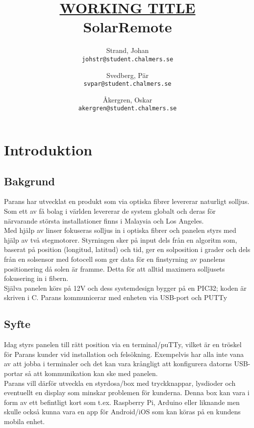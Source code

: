 \documentclass{article}
\author{	Strand, Johan \\ \texttt{johstr@student.chalmers.se} \and
			Svedberg, Pär\\ \texttt{svpar@student.chalmers.se} \and
			Åkergren, Oskar\\ \texttt{akergren@student.chalmers.se}
}
\title{\underline{\small{WORKING TITLE}} \\ SolarRemote}
\begin{document}
	\maketitle
	\thispagestyle{empty}

	\newpage 

	\tableofcontents

	\newpage

	\section{Introduktion} %
	\label{sec:introduktion}

		\subsection{Bakgrund} %
		\label{sub:bakgrund}
			Parans har utvecklat en produkt som via optiska fibrer levererar naturligt solljus. Som ett av få bolag i världen levererar de system globalt och deras för närvarande största installationer finns i Malaysia och Los Angeles.\\

			\noindent Med hjälp av linser fokuseras solljus in i optiska fibrer och panelen styrs med hjälp av två stegmotorer. Styrningen sker på input dels från en algoritm som, baserat på position (longitud, latitud) och tid, ger en solposition i grader och dels från en solsensor med fotocell som ger data för en finstyrning av panelens positionering då solen är framme. Detta för att alltid maximera solljusets fokusering in i fibern.\\

			\noindent Själva panelen körs på 12V och dess systemdesign bygger på en PIC32; koden är skriven i C. Parans kommunicerar med enheten via USB-port och PUTTy
		
		\subsection{Syfte} %
		\label{sub:syfte}
			Idag styrs panelen till rätt position via en terminal/puTTy, vilket är en tröskel för Parans kunder vid installation och felsökning.  Exempelvis har alla inte vana av att jobba i terminaler och det kan vara krångligt att konfigurera datorns USB-portar så att kommunikation kan ske med panelen. \\

			\noindent Parans vill därför utveckla en styrdosa/box med tryckknappar, lysdioder och eventuellt en display som minskar problemen för kunderna. Denna box kan vara i form av ett befintligt kort som t.ex. Raspberry Pi, Arduino eller liknande men skulle också kunna vara en app för Android/iOS som kan köras på en kundens mobila enhet.
\end{document}

